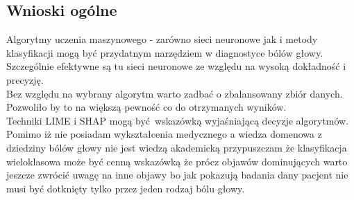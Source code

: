 \newpage
\subsection{Wnioski ogólne}
Algorytmy uczenia maszynowego - zarówno sieci neuronowe jak i metody klasyfikacji mogą być przydatnym narzędziem w diagnostyce bólów głowy.\\

Szczególnie efektywne są tu sieci neuronowe ze względu na wysoką dokładność i precyzję.\\

Bez względu na wybrany algorytm warto zadbać o zbalansowany zbiór danych. Pozwoliło by to na większą pewność co do otrzymanych wyników.\\

Techniki LIME i SHAP mogą być wskazówką wyjaśniającą decyzje algorytmów.\\

Pomimo iż nie posiadam wykształcenia medycznego a wiedza domenowa z dziedziny bólów głowy nie jest wiedzą akademicką przypuszczam że klasyfikacja wieloklasowa może być cenną wskazówką że prócz objawów dominujących warto jeszcze zwrócić uwagę na inne objawy bo jak pokazują badania dany pacjent nie musi być dotknięty tylko przez jeden rodzaj bólu głowy.
